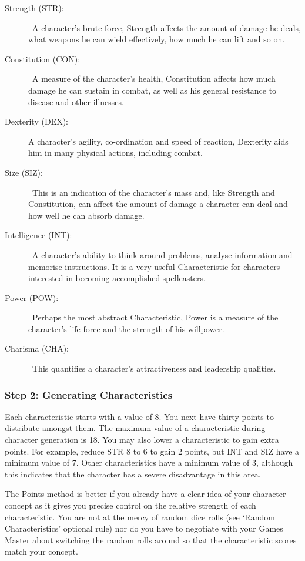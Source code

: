 \begin{description}
	\item[Strength (STR):] A character’s brute force, Strength affects the amount of damage he deals, what weapons he can wield effectively, how much he can lift and so on. 
	\item[Constitution (CON):] A measure of the character’s health, Constitution affects how much damage he can sustain in combat, as well as his general resistance to disease and other illnesses.
	\item[Dexterity (DEX):] A character’s agility, co-ordination and speed of reaction, Dexterity aids him in many physical actions, including combat. 
	\item[Size (SIZ):] This is an indication of the character’s mass and, like Strength and Constitution, can affect the amount of damage a character can deal and how well he can absorb damage.
	\item[Intelligence (INT):] A character’s ability to think around problems, analyse information and memorise instructions. It is a very useful Characteristic for characters interested in becoming accomplished spellcasters. 
	\item[Power (POW):] Perhaps the most abstract Characteristic, Power is a measure of the character’s life force and the strength of his willpower.
	\item[Charisma (CHA):] This quantifies a character’s attractiveness and leadership qualities. 
\end{description}


\subsubsection{Step 2: Generating Characteristics}
Each characteristic starts with a value of 8.  You next have thirty points to distribute amongst them. The maximum value of a characteristic during character generation is 18. You may also lower a characteristic to gain extra points. For example, reduce STR 8 to 6 to gain 2 points, but INT and SIZ have a minimum value of 7.  Other characteristics have a minimum value of 3, although this indicates that the character has a severe disadvantage in this area. 

The Points method is better if you already have a clear idea of your character concept as it gives you precise control on the relative strength of each characteristic. You are not at the mercy of random dice rolls (see `Random Characteristics' optional rule) nor do you have to negotiate with your Games Master about switching the random rolls around so that the characteristic scores match your concept.

